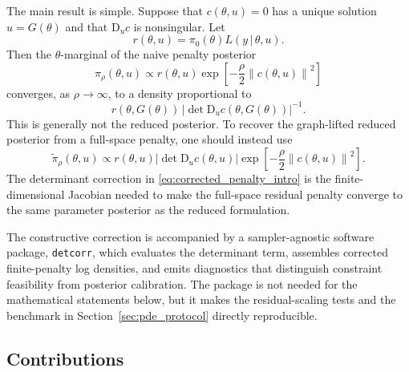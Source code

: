 \documentclass[11pt]{article}
\newcommand{\D}{\mathrm{D}}
\newcommand{\abs}[1]{\left\lvert #1\right\rvert}
\newcommand{\norm}[1]{\left\lVert #1\right\rVert}
\newcommand{\given}{\,|\,}
\newcommand{\detcorr}{\texttt{detcorr}}
\begin{document}
The main result is simple. Suppose that \(c(\theta,u)=0\) has a unique solution \(u=G(\theta)\) and that \(\D_u c\) is nonsingular. Let
\begin{equation}
 r(\theta,u) = \pi_0(\theta)L(y\given\theta,u). \label{eq:r_def}
\end{equation}
Then the \(\theta\)-marginal of the naive penalty posterior
\begin{equation}
 \pi_\rho(\theta,u)
 \propto
 r(\theta,u)
 \exp\!\left[-\frac{\rho}{2}\norm{c(\theta,u)}^2\right]
 \label{eq:naive_penalty_intro}
\end{equation}
converges, as \(\rho\to\infty\), to a density proportional to
\begin{equation}
 r(\theta,G(\theta))\,
 \abs{\det\D_u c(\theta,G(\theta))}^{-1}. \label{eq:naive_limit_intro}
\end{equation}
This is generally not the reduced posterior. To recover the graph-lifted reduced posterior from a full-space penalty, one should instead use
\begin{equation}
 \widetilde{\pi}_\rho(\theta,u)
 \propto
 r(\theta,u)
 \abs{\det\D_u c(\theta,u)}
 \exp\!\left[-\frac{\rho}{2}\norm{c(\theta,u)}^2\right].
 \label{eq:corrected_penalty_intro}
\end{equation}
The determinant correction in \eqref{eq:corrected_penalty_intro} is the finite-dimensional Jacobian needed to make the full-space residual penalty converge to the same parameter posterior as the reduced formulation.

The constructive correction is accompanied by a sampler-agnostic software package, \detcorr, which evaluates the determinant term, assembles corrected finite-penalty log densities, and emits diagnostics that distinguish constraint feasibility from posterior calibration. The package is not needed for the mathematical statements below, but it makes the residual-scaling tests and the benchmark in Section~\ref{sec:pde_protocol} directly reproducible.


\subsection*{Contributions}
\end{document}
